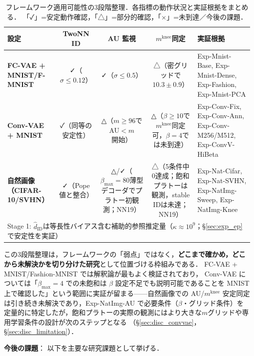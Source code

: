 \documentclass[11pt,a4paper]{jsarticle}
\newcommand{\kap}{\kappa}
\newcommand{\mknee}{m^{\mathrm{knee}}}
\begin{document}
\begin{table}[H]
\centering
\caption{フレームワーク適用可能性の3段階整理．各指標の動作状況と実証根拠をまとめる．
「✓」=安定動作確認，「△」=部分的確認，「×」=未到達／今後の課題．}
\label{tab:applicability_tier}
\small
\begin{tabular}{lcccp{3.8cm}}
\toprule
設定 & TwoNN ID & AU 監視 & $\mknee$同定 & 実証根拠 \\
\midrule
\textbf{FC-VAE + MNIST/F-MNIST}
  & ✓（$\sigma\leq0.12$）
  & ✓（$\sigma\leq0.5$）
  & △（密グリッドで$10.3\pm0.9$）
  & Exp-Mnist-Base, Exp-Mnist-Dense, Exp-Fashion, Exp-Mnist-PCA \\
\addlinespace
\textbf{Conv-VAE + MNIST}
  & ✓（同等の安定性）
  & △（$m\geq96$で AU$<m$開始）
  & △（$\beta\geq10$で$\mknee$同定可，$\beta=4$では未到達）
  & Exp-Conv-Fix, Exp-Conv-Ann, Exp-Conv-M256/M512, Exp-ConvV-HiBeta \\
\addlinespace
\textbf{自然画像（CIFAR-10/SVHN）}
  & ✓（Pope値と整合）
  & △/✓（$\beta_{\max}=80$薄型デコーダでプラトー初観測；NN19）
  & △（5条件中0達成；飽和プラトーは観測，stable IDは未達；NN19）
  & Exp-Nat-Cifar, Exp-Nat-SVHN, Exp-NatImg-Sweep, Exp-NatImg-Knee \\
\midrule
\multicolumn{5}{l}{\small Stage 1: $\hat{d}_\mathrm{ID}$は等長性バイアス含む補助的参照推定量（$\kap\approx10^9$；§\ref{sec:exp_ep}で安定性を実証）}\\
\bottomrule
\end{tabular}
\end{table}

この3段階整理は，フレームワークの「弱点」ではなく，\textbf{どこまで確かめ，どこから未解決かを切り分けた研究}として位置づける枠組みである．
FC-VAE + MNIST/Fashion-MNIST では解釈論が最もよく検証されており，
Conv-VAE については「$\beta_{\max}=4$ での未飽和は $\beta$ 設定不足でも説明可能であることを MNIST 上で確認した」という範囲に実証が留まる——自然画像での AU/$\mknee$ 安定同定は引き続き未解決であり，Exp-NatImg-AU で必要条件（$\beta$・グリッド条件）を定量的に特定したが，飽和プラトーの実際の観測にはより大きな$m$グリッドや専用学習条件の設計が次のステップとなる
（§\ref{sec:disc_convvae}，§\ref{sec:disc_limitation}）．

\textbf{今後の課題}：
以下を主要な研究課題として挙げる．
\end{document}
